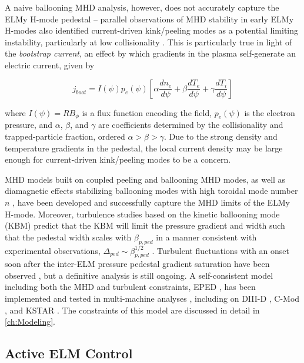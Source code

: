 A naive ballooning MHD analysis, however, does not accurately capture the ELMy H-mode pedestal -- parallel observations of MHD stability in early ELMy H-modes also identified current-driven kink/peeling modes as a potential limiting instability, particularly at low collisionality \cite{Connor1998,Suttrop2000,Groebner1998a}.  This is particularly true in light of the \emph{bootstrap current}, an effect by which gradients in the plasma self-generate an electric current, given by \cite{Sauter1999}

\begin{equation}\label{eq:jboot}
 j_{boot} = I(\psi) p_e(\psi) \left[ \alpha \frac{dn_e}{d\psi} + \beta \frac{dT_e}{d\psi} + \gamma \frac{dT_i}{d\psi}\right]
\end{equation}

\noindent where $I(\psi) = RB_\phi$ is a flux function encoding the field, $p_e(\psi)$ is the electron pressure, and $\alpha$, $\beta$, and $\gamma$ are coefficients determined by the collisionality and trapped-particle fraction, ordered $\alpha > \beta > \gamma$.  Due to the strong density and temperature gradients in the pedestal, the local current density may be large enough for current-driven kink/peeling modes to be a concern.  

MHD models built on coupled peeling and ballooning MHD modes, as well as diamagnetic effects stabilizing ballooning modes with high toroidal mode number $n$ \cite{Suttrop2000}, have been developed \cite{Snyder2002,Turnbull2003} and successfully capture the MHD limits of the ELMy H-mode.  Moreover, turbulence studies based on the kinetic ballooning mode (KBM) \cite{Tang1980} predict that the KBM will limit the pressure gradient and width such that the pedestal width scales with $\beta_{p,ped}$ in a manner consistent with experimental observations, $\Delta_{ped} \sim \beta_{p,ped}^{1/2}$ \cite{Snyder2001}.  Turbulent fluctuations with an onset soon after the inter-ELM pressure pedestal gradient saturation have been observed \cite{Diallo2014}, but a definitive analysis is still ongoing.  A self-consistent model including both the MHD and turbulent constraints, EPED \cite{Snyder2009}, has been implemented and tested in multi-machine analyses \cite{Groebner2013}, including on DIII-D \cite{Snyder2012}, C-Mod \cite{
Walk2012}, and KSTAR \cite{Han2013}.  The constraints of this model are discussed in detail in \cref{ch:Modeling}.

\subsection{Active ELM Control}\label{subsec:hcr_elmy_control}

